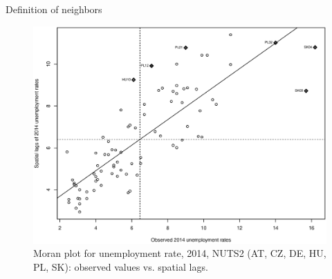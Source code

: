 \documentclass{beamer}
\begin{document}
\begin{frame}{Definition of neighbors}
\vspace{-0.3cm}
\begin{figure}
	\includegraphics[width=.7\textwidth]{IMG/sp_MoranPlot.eps}
	\caption[]{Moran plot for unemployment rate, 2014, NUTS2 (AT, CZ, DE, HU, PL, SK): observed values vs. spatial lags.}
\end{figure}
\end{frame}
\end{document}
